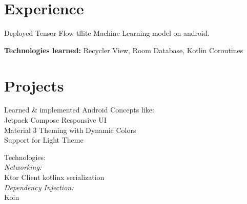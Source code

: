 \documentclass[]{deedy-resume-openfont}
\begin{document}
\begin{minipage}[t]{0.66\textwidth} 


\section{Experience}

\vspace{\topsep} %
\begin{tightemize}
\item Deployed Tensor Flow tflite Machine Learning model on android.
\item \textbf{Technologies learned: } Recycler View, Room Database, Kotlin Coroutines
\end{tightemize}
\sectionsep







\section{Projects}

\href{https://github.com/mdabdulazizzisan/Crypto-Tracker}{}
\begin{tightemize}
\item Learned \& implemented Android Concepts like: \\
\quad \textbullet{} Jetpack Compose \textbullet{} Responsive UI \\
\quad \textbullet{} Material 3 Theming with Dynamic Colors \\
\quad \textbullet{} Support for Light Theme \\
\item Technologies: \\
\quad \textit{Networking:} \\
\quad \quad \textbullet{} Ktor Client \textbullet{} kotlinx serialization \\
\quad \textit{Dependency Injection:} \\
\quad \quad \textbullet{} Koin \\
\end{tightemize}
\sectionsep


\end{minipage}
\end{document}
